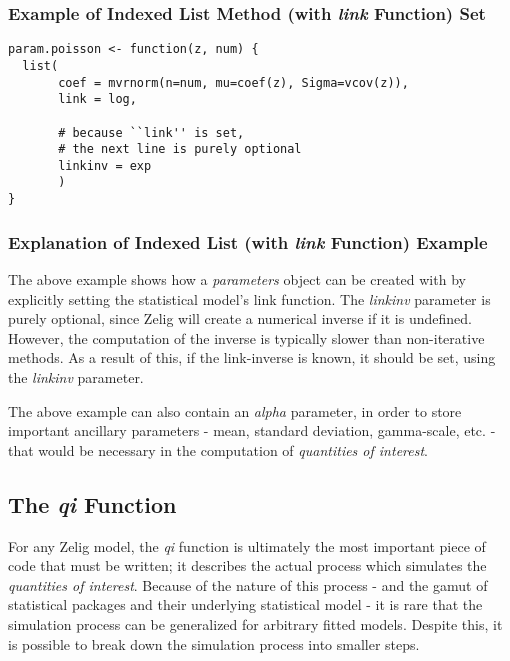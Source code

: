 \subsubsection{Example of Indexed List Method (with \emph{link} Function) Set}

\begin{verbatim}
param.poisson <- function(z, num) {
  list(
       coef = mvrnorm(n=num, mu=coef(z), Sigma=vcov(z)),
       link = log,
             
       # because ``link'' is set,
       # the next line is purely optional
       linkinv = exp
       )
}
\end{verbatim}


\subsubsection{Explanation of Indexed List (with \emph{link} Function) Example}

The above example shows how a \emph{parameters} object can be created with by explicitly setting the statistical model's link function.  The \emph{linkinv} parameter is purely optional, since Zelig will create a numerical inverse if it is undefined.  However, the computation of the inverse is typically slower than non-iterative methods.  As a result of this, if the link-inverse is known, it should be set, using the \emph{linkinv} parameter.

The above example can also contain an \emph{alpha} parameter, in order to store important ancillary parameters - mean, standard deviation, gamma-scale, etc. - that would be necessary in the computation of \emph{quantities of interest}.


\subsection{The \emph{qi} Function}

For any Zelig model, the \emph{qi} function is ultimately the most important piece of code that must be written; it describes the actual process which simulates the \emph{quantities of interest}.  Because of the nature of this process - and the gamut of statistical packages and their underlying statistical model - it is rare that the simulation process can be generalized for arbitrary fitted models.  Despite this, it is possible to break down the simulation process into smaller steps.

